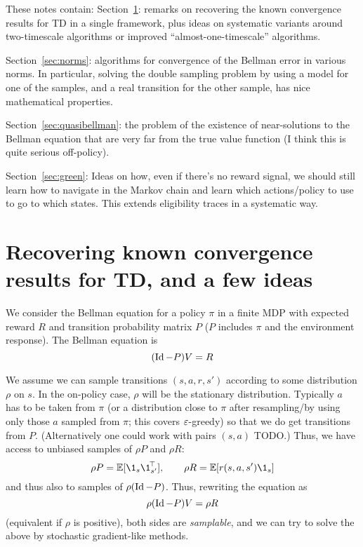 \documentclass[11pt,a4paper]{article}
\begin{document}
These notes contain: Section~\ref{sec:tdconv}: remarks on recovering the known convergence results
for TD in a single framework, plus ideas on systematic variants around
two-timescale algorithms or improved ``almost-one-timescale'' algorithms.

Section~\ref{sec:norms}: algorithms for convergence of the Bellman error
in various norms. In particular, solving the double sampling problem by
using a model for one of the samples, and a real transition for the other
sample, has nice mathematical properties.

Section~\ref{sec:quasibellman}: the problem of the existence of near-solutions to the Bellman
equation that are very far from the true value function (I think this is
quite serious off-policy).

Section~\ref{sec:green}: Ideas on how, even if there's no reward signal, we should
still learn how to navigate in the Markov chain and learn which
actions/policy to use to go to which states. This extends eligibility
traces in a systematic way.

\section{Recovering known convergence results for TD, and a few ideas}
\label{sec:tdconv}

We consider the Bellman equation for a policy $\pi$ in a finite MDP with
expected reward $R$ and transition probability matrix $P$ ($P$ includes $\pi$ and
the environment response). The Bellman equation is
\begin{equation}
(\operatorname{Id}-P)V=R
\end{equation}

We assume we can sample transitions $(s,a,r,s')$ according to some
distribution $\rho$ on $s$. In the on-policy case, $\rho$ will be the
stationary distribution. Typically $a$ has to be taken from $\pi$ (or a
distribution close to $\pi$ after resampling/by using only those $a$
sampled from $\pi$; this covers $\varepsilon$-greedy) so that we do get
transitions from
$P$. (Alternatively one could work with pairs $(s,a)$ TODO.) Thus, we
have access to unbiased samples of $\rho P$ and $\rho R$:
\begin{equation}
\rho P=\E[\1_{s}\transp{\1_{s'}}\,],\qquad \rho R=\E[r(s,a,s')\1_{s}]
\end{equation}
and thus also to samples of $\rho(\operatorname{Id}-P)$. Thus, rewriting the equation
as
\begin{equation}
\rho(\operatorname{Id}-P)V=\rho R
\end{equation}
(equivalent if $\rho$ is positive), both sides are \emph{samplable}, and we can try to solve the above by
stochastic gradient-like methods.
\end{document}

